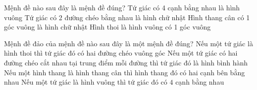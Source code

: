 \begin{ex}%
	 Mệnh đề nào sau đây là mệnh đề đúng?
	 \choice
		{Tứ giác có 4 cạnh bằng nhau là  hình vuông}
		{Tứ giác có 2 đường chéo bằng  nhau là hình chữ nhật}
		{\True Hình thang cân có 1  góc vuông là hình chữ nhật}
		{Hình thoi là hình vuông có 1 góc  vuông}
	\loigiai{ 
	 }
\end{ex}

\begin{ex}%
	 Mệnh đề đảo của mệnh đề nào sau đây là một mệnh đề đúng?
	\choice 
		{Nếu một tứ giác là hình thoi thì tứ giác đó có hai đường  chéo vuông góc}
		{\True Nếu một tứ giác có hai đường chéo cắt nhau tại trung điểm mỗi đường thì tứ giác đó là  hình bình hành}
		{Nếu  một hình thang là hình thang cân thì hình thang đó có hai cạnh bên bằng nhau}
		{Nếu một tứ giác là hình vuông thì tứ giác đó có $4$ cạnh bằng nhau} 
\end{ex}
